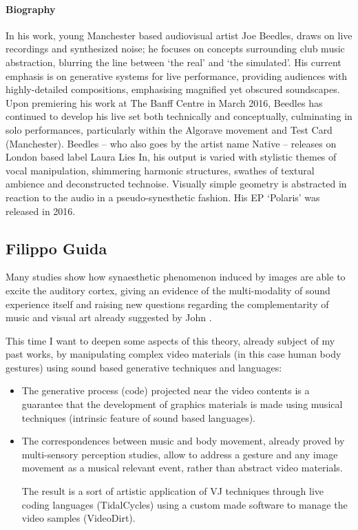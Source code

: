 \documentclass[sigplan,10pt,review]{acmart}\settopmatter{printfolios=true}
\begin{document}
\paragraph{Biography}
In his work, young Manchester based audiovisual artist Joe Beedles,
draws on live recordings and synthesized noise; he focuses on concepts
surrounding club music abstraction, blurring the line between ‘the
real’ and ‘the simulated’. His current emphasis is on generative
systems for live performance, providing audiences with highly-detailed
compositions, emphasising magnified yet obscured soundscapes.  Upon
premiering his work at The Banff Centre in March 2016, Beedles has
continued to develop his live set both technically and conceptually,
culminating in solo performances, particularly within the Algorave
movement and Test Card (Manchester). Beedles – who also goes by the
artist name Native – releases on London based label Laura Lies In, his
output is varied with stylistic themes of vocal manipulation,
shimmering harmonic structures, swathes of textural ambience and
deconstructed technoise. Visually simple geometry is abstracted in
reaction to the audio in a pseudo-synesthetic fashion. His EP
‘Polaris’ was released in 2016.

\subsection{Filippo Guida}

Many studies show how synaesthetic phenomenon induced by images are
able to excite the auditory cortex, giving an evidence of the
multi-modality of sound experience itself \citep{Riddoch12} and raising
new questions regarding the complementarity of music and visual art
already suggested by John \citet{Whitney80}.

This time I want to deepen some aspects of this theory, already
subject of my past works, by manipulating complex video materials (in
this case human body gestures) using sound based generative techniques
and languages:

\begin{itemize}
\item The generative process (code) projected near the video contents is a guarantee that the development of graphics materials is made using musical techniques (intrinsic feature of sound based languages).
\item The correspondences between music and body movement, already proved by multi-sensory perception studies, allow to address a gesture and any image movement as a musical relevant event, rather than abstract video materials\citep{Haga08}.

  The result is a sort of artistic application of VJ techniques through live coding languages (TidalCycles) using a custom made software to manage the video samples (VideoDirt).
\end{itemize}
\end{document}
